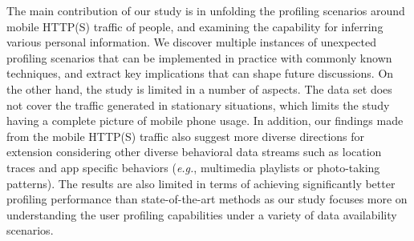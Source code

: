The main contribution of our study is in unfolding the profiling scenarios around mobile HTTP(S) traffic of people, and examining the capability for inferring various personal information. We discover multiple instances of unexpected profiling scenarios that can be implemented in practice with commonly known techniques, and extract key implications that can shape future discussions. On the other hand, the study is limited in a number of aspects. The data set does not cover the traffic generated in stationary situations, which limits the study having a complete picture of mobile phone usage. In addition, our findings made from the mobile HTTP(S) traffic also suggest more diverse directions for extension considering other diverse behavioral data streams such as location traces and app specific behaviors (\textit{e.g.}, multimedia playlists or photo-taking patterns). The results are also limited in terms of achieving significantly better profiling performance than state-of-the-art methods as our study focuses more on understanding the  user profiling capabilities under a variety of data availability scenarios. 